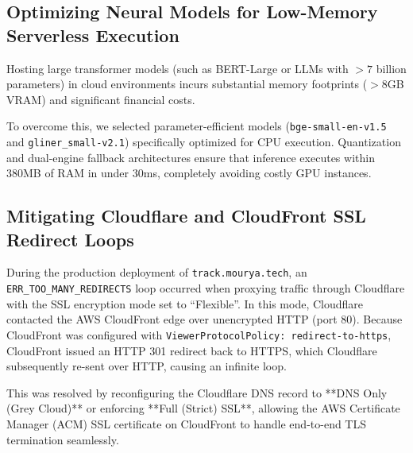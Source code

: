 \subsection{Optimizing Neural Models for Low-Memory Serverless Execution}
Hosting large transformer models (such as BERT-Large or LLMs with $>7$ billion parameters) in cloud environments incurs substantial memory footprints ($>8$GB VRAM) and significant financial costs. 

To overcome this, we selected parameter-efficient models (\texttt{bge-small-en-v1.5} and \texttt{gliner\_small-v2.1}) specifically optimized for CPU execution. Quantization and dual-engine fallback architectures ensure that inference executes within 380MB of RAM in under 30ms, completely avoiding costly GPU instances.

\subsection{Mitigating Cloudflare and CloudFront SSL Redirect Loops}
During the production deployment of \texttt{track.mourya.tech}, an \texttt{ERR\_TOO\_MANY\_REDIRECTS} loop occurred when proxying traffic through Cloudflare with the SSL encryption mode set to ``Flexible''. In this mode, Cloudflare contacted the AWS CloudFront edge over unencrypted HTTP (port 80). Because CloudFront was configured with \texttt{ViewerProtocolPolicy: redirect-to-https}, CloudFront issued an HTTP 301 redirect back to HTTPS, which Cloudflare subsequently re-sent over HTTP, causing an infinite loop.

This was resolved by reconfiguring the Cloudflare DNS record to **DNS Only (Grey Cloud)** or enforcing **Full (Strict) SSL**, allowing the AWS Certificate Manager (ACM) SSL certificate on CloudFront to handle end-to-end TLS termination seamlessly.

